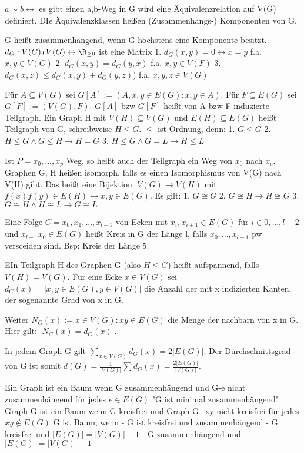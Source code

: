 \documentclass[10pt,landscape]{article}
\begin{document}
\begin{multicols}{3}
{{{$a\sim b \leftrightarrow$ es gibt einen a,b-Weg in G wird eine Äquivalenzrelation auf V(G) definiert. DIe Äquivalenzklassen heißen (Zusammenhangs-) Komponenten von G.

G heißt zusammenhängend, wenn G höchstens eine Komponente besitzt. $d_G: V(G) x V(G) \leftrightarrow \R_{\geq 0}$ ist eine Matrix
1. $d_G(x,y)=0 \leftrightarrow x=y$ f.a. $x,y \in V(G)$
2. $d_G(x,y)=d_G(y,x)$ f.a. $x,y\in V(F)$
3. $d_G(x,z)\leq d_G(x,y) + d_G(y,z))$ f.a. $x,y,z \in V(G)$

Für $A\subseteq V(G)$ sei $G[A]:= (A, {x,y\in E(G):x,y\in A})$. Für $F\subseteq E(G)$ sei $G[F]:=(V(G), F)$. $G[A]$ bzw $G[F]$ heißt von A bzw F induzierte Teilgraph. Ein Graph H mit $V(H)\subseteq V(G)$ und $E(H)\subseteq E(G)$ heißt Teilgraph von G, schreibweise $H\leq G$. $\leq$ ist Ordnung, denn:
1. $G\leq G$
2. $H\leq G \wedge G\leq H \rightarrow H=G$
3. $H\leq G \wedge G=L \rightarrow H\leq L$

Ist $P=x_0,...,x_p$ Weg, so heißt auch der Teilgraph ein Weg von $x_0$ nach $x_e$.
Graphen G, H heißen isomorph, falls es einen Isomorphismus von V(G) nach V(H) gibt. Das heißt eine Bijektion.
$V(G)\rightarrow V(H)$ mit $f(x)f(y)\in E(H)\leftrightarrow x,y \in E(G)$. Es gilt:
1. $G\cong G$
2. $G\cong H \rightarrow H \cong G$
3. $G\cong H \wedge H\cong L \rightarrow G\cong L$

Eine Folge $C=x_0,x_1,...,x_{l-1}$ von Ecken mit $x_i,x_{i+1}\in E(G)$ für $i\in {0,...,l-2}$ und $x_{l-1}x_0 \in E(G)$ heißt Kreis in G der Länge l, falls $x_0,...,x_{l-1}$ pw versceiden sind. Bsp: Kreis der Länge 5.

EIn Teilgraph H des Graphen G (also $H\leq G$) heißt aufspannend, falls $V(H)=V(G)$. Für eine Ecke $x\in V(G)$ sei $d_G(x)=|{x,y\in E(G), y\in V(G)}|$ die Anzahl der mit x indizierten Kanten, der sogenannte Grad von x in G.

Weiter $N_G(x):={x\in V(G): xy \in E(G)}$ die Menge der nachbarn von x in G. Hier gilt: $|N_G(x)=d_G(x)|$.

In jedem Graph G gilt $\sum_{x\in V(G)} d_G(x)=2|E(G)|$. Der Durchschnittsgrad von G ist somit $\bar{d(G)}=\frac{1}{|V(G)|}\sum d_G(x)=\frac{2|E(G)|}{|V(G)|}$.

Ein Graph ist ein Baum wenn G zusammenhängend und G-e nicht zusammenhängend für jedes $e\in E(G)$ "G ist minimal zusammenhängend"
Graph G ist ein Baum wenn G kreisfrei und Graph G+xy nicht kreisfrei für jedes $xy \not\in E(G)$
G ist Baum, wenn
- G ist kreisfrei und zusammenhängend
- G kreisfrei und $|E(G)|=|V(G)|-1$
- G zusammenhängend und $|E(G)|=|V(G)|-1$

}}}
\end{multicols}
\end{document}

